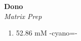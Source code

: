 \textbf{Dono} 
\\
\textit{Matrix Prep}
\begin{enumerate}
\item{52.86 mM \alpha-cyano=-}
\end{enumerate}
